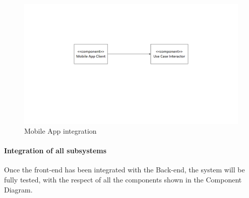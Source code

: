 \begin{figure}[H]
\centering
\includegraphics[width=\textwidth]{Images/BackEndIntegration.png}
\caption{\label{fig:BackEndIntegration} Mobile App integration}
\end{figure}

\paragraph{Integration of all subsystems}
Once the front-end has been integrated with the Back-end, the system will be fully tested, with the respect of all the components shown in the Component Diagram.
